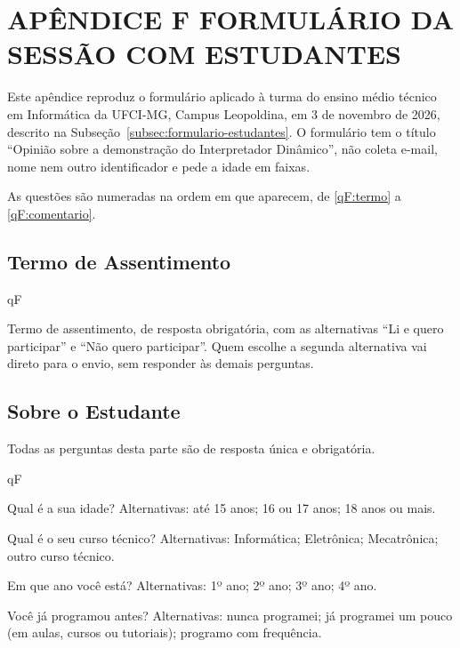 \chapter[APÊNDICE F -- FORMULÁRIO DA SESSÃO COM ESTUDANTES]{{\centering APÊNDICE F \textendash{} FORMULÁRIO DA SESSÃO COM ESTUDANTES}}  \label{ap:formulario-estudantes}

Este apêndice reproduz o formulário aplicado à turma do ensino médio técnico em Informática da UFCI-MG, Campus Leopoldina, em 3 de novembro de 2026, descrito na Subseção~\ref{subsec:formulario-estudantes}. O formulário tem o título ``Opinião sobre a demonstração do Interpretador Dinâmico'', não coleta e-mail, nome nem outro identificador e pede a idade em faixas.

As questões são numeradas na ordem em que aparecem, de \ref{qF:termo} a \ref{qF:comentario}.

\section{Termo de Assentimento}

\begin{questoes}{qF}
    \item\label{qF:termo} Termo de assentimento, de resposta obrigatória, com as alternativas ``Li e quero participar'' e ``Não quero participar''. Quem escolhe a segunda alternativa vai direto para o envio, sem responder às demais perguntas.
\end{questoes}

\section{Sobre o Estudante}

Todas as perguntas desta parte são de resposta única e obrigatória.

\begin{questoes}{qF}
    \item\label{qF:perfil-ini} Qual é a sua idade? Alternativas: até 15 anos; 16 ou 17 anos; 18 anos ou mais.
    \item Qual é o seu curso técnico? Alternativas: Informática; Eletrônica; Mecatrônica; outro curso técnico.
    \item Em que ano você está? Alternativas: 1º ano; 2º ano; 3º ano; 4º ano.
    \item\label{qF:perfil-fim} Você já programou antes? Alternativas: nunca programei; já programei um pouco (em aulas, cursos ou tutoriais); programo com frequência.
\end{questoes}

